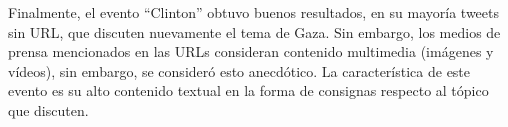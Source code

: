     Finalmente, el evento ``Clinton'' obtuvo buenos resultados, en su
    mayoría tweets sin URL, que discuten nuevamente el tema de
    Gaza. Sin embargo, los medios de prensa mencionados en las URLs
    consideran contenido multimedia (imágenes y vídeos), sin embargo,
    se consideró esto anecdótico. La característica de este evento es
    su alto contenido textual en la forma de consignas respecto al
    tópico que discuten.